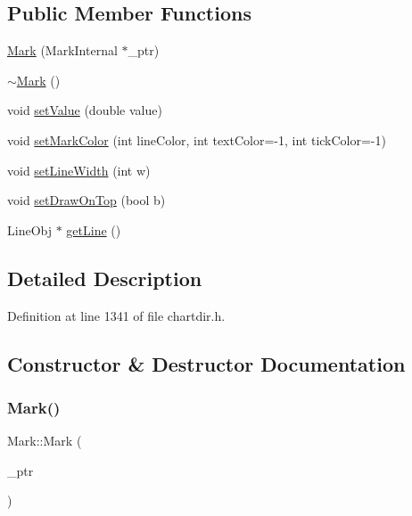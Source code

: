 \subsection*{Public Member Functions}
\begin{DoxyCompactItemize}
\item 
\hyperlink{class_mark_af305f3ac9a644353068ea89462e458db}{Mark} (Mark\+Internal $\ast$\+\_\+ptr)
\item 
\hyperlink{class_mark_a36a64089bd6fdca80b5356f59e62c1b3}{$\sim$\+Mark} ()
\item 
void \hyperlink{class_mark_ab1ba925b610ba216b79da27660553cfc}{set\+Value} (double value)
\item 
void \hyperlink{class_mark_a61c1d13aaab343847f90d929158e7b77}{set\+Mark\+Color} (int line\+Color, int text\+Color=-\/1, int tick\+Color=-\/1)
\item 
void \hyperlink{class_mark_a6a7b98154ccea45ca673e2ec658a28ad}{set\+Line\+Width} (int w)
\item 
void \hyperlink{class_mark_a2d599567c3fa6109d6d8c75625fb251b}{set\+Draw\+On\+Top} (bool b)
\item 
Line\+Obj $\ast$ \hyperlink{class_mark_a7e623a0eef4340850fd13605f95b65d4}{get\+Line} ()
\end{DoxyCompactItemize}


\subsection{Detailed Description}


Definition at line 1341 of file chartdir.\+h.



\subsection{Constructor \& Destructor Documentation}
\mbox{\label{class_mark_af305f3ac9a644353068ea89462e458db}} 
\subsubsection{\texorpdfstring{Mark()}{Mark()}}
{\footnotesize\ttfamily Mark\+::\+Mark (\begin{DoxyParamCaption}\item[{Mark\+Internal $\ast$}]{\+\_\+ptr }\end{DoxyParamCaption})\hspace{0.3cm}{\ttfamily [inline]}}



